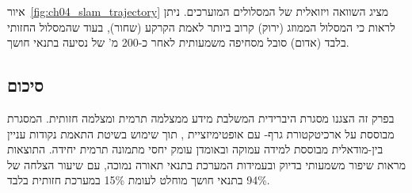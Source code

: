 איור~\ref{fig:ch04_slam_trajectory} מציג השוואה ויזואלית של המסלולים המוערכים. ניתן לראות כי המסלול הממוזג (ירוק) קרוב ביותר לאמת הקרקע (שחור), בעוד שהמסלול החזותי בלבד (אדום) סובל מסחיפה משמעותית לאחר כ-200 מ' של נסיעה בתנאי חושך.

\subsection{סיכום}
\label{sec:ch04_summary}

בפרק זה הצגנו מסגרת  היברידית המשלבת מידע ממצלמה תרמית ומצלמה חזותית. המסגרת מבוססת על ארכיטקטורת גרף- עם אופטימיזציית , תוך שימוש בשיטת התאמת נקודות עניין בין-מודאלית מבוססת למידה עמוקה ובאומדן עומק יחסי מתמונה תרמית יחידה. התוצאות מראות שיפור משמעותי בדיוק ובעמידות המערכת בתנאי תאורה נמוכה, עם שיעור הצלחה של 94\% בתנאי חושך מוחלט לעומת 15\% במערכת חזותית בלבד.